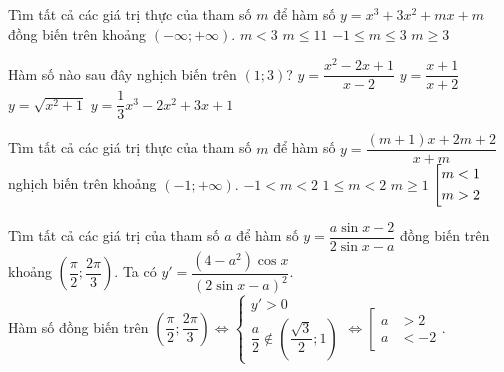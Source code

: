 \begin{ex}%
Tìm tất cả các giá trị thực của tham số $m$ để hàm số $y=x^3+3x^2+mx+m$ đồng biến trên khoảng $(-\infty;+\infty).$
\choice
{$m<3$}
{$m\leq 11$}
{$-1\leq m\leq 3$}
{\True $m\geq 3$}
\end{ex} 
\begin{ex}%
	Hàm số nào sau đây nghịch biến trên $(1;3)$?
	\choice
	{$y=\dfrac{x^2-2x+1}{x-2}$}
	{$y=\dfrac{x+1}{x+2}$}
	{$y=\sqrt{x^2+1}$}
	{\True $y=\dfrac{1}{3}x^3-2x^2+3x+1$}
\end{ex}
\begin{ex}%
Tìm tất cả các giá trị thực của tham số $m$ để hàm số $y=\dfrac{(m+1)x+2m+2}{x+m}$ nghịch biến trên khoảng $(-1;+\infty).$
\choice
{$-1<m<2$}
{\True $1\leq m<2$}
{$m\geq 1$}
{$\left[\begin{aligned}&m<1\\&m>2\end{aligned}\right.$} 
\end{ex}
\begin{ex}%
Tìm tất cả các giá trị của tham số  $a$ để hàm số $y=\dfrac{a\sin x-2}{2\sin x-a}$  đồng biến trên khoảng $\left(\dfrac{\pi}{2};\dfrac{2\pi}{3} \right).$ 
\choice{$-2<a\le \sqrt{3}$}{$-2\le a \le 2$}{\True $\left[ \begin{aligned} a&>2 \\ a&<-2 \end{aligned}\right.$}{$-2<a<2$}
\loigiai
{Ta có $ y' =\dfrac{(4-a^2)\cos x}{(2\sin x -a)^2}$.\\
Hàm số đồng biến  trên  $\left(\dfrac{\pi}{2};\dfrac{2\pi}{3} \right)\Leftrightarrow \begin{cases}  y'>0 \\ \dfrac{a	}{2} \notin \left( \dfrac{\sqrt{3}}{2};1\right) \end{cases} \Leftrightarrow \left[ \begin{aligned} a&>2 \\ a&<-2 \end{aligned}\right. $. 
}
\end{ex}
